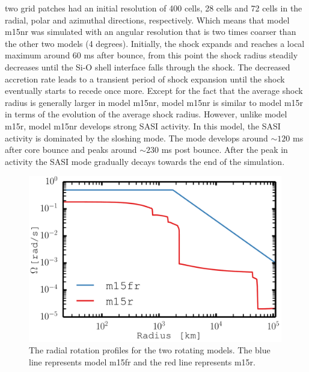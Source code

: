 \begin{itemize}
two grid patches had an initial resolution of 400 cells, 28 cells and 72 cells in the radial, polar and
azimuthal directions, respectively. Which means that model m15nr was simulated with an angular resolution that is
two times coarser than the other two models (4 degrees). Initially, the shock expands and reaches a local maximum around $60$ ms after bounce,
from this point the shock radius steadily decreases until the Si-O shell interface falls through the shock. The decreased accretion rate
leads to a transient period of shock expansion until the shock eventually starts to recede once more. Except for the fact that
the average shock radius is generally larger in model m15nr, model m15nr is similar to model m15r in terms of the evolution of the average shock
radius. However, unlike model m15r, model m15nr develops strong SASI activity. In this model, the SASI activity is dominated by the sloshing mode.
The mode develops around $\sim 120$ ms after core bounce and peaks around $\sim 230$ ms post bounce. After the peak in activity 
the SASI mode gradually decays towards the end of the simulation.   
\end{itemize}
\begin{figure}[ht]           
\centering                            
\includegraphics[width=0.99\textwidth]{./images/paper2/rot.pdf}
\caption{The radial rotation profiles for the two rotating models. The blue line represents model 
m15fr and the red line represents m15r. \label{figp2:rot}}
\end{figure}
